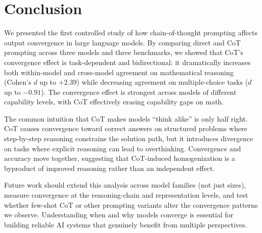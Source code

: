 \section{Conclusion}
\label{sec:conclusion}

We presented the first controlled study of how chain-of-thought prompting affects output convergence in large language models. By comparing direct and CoT prompting across three models and three benchmarks, we showed that CoT's convergence effect is task-dependent and bidirectional: it dramatically increases both within-model and cross-model agreement on mathematical reasoning (Cohen's $d$ up to $+2.39$) while decreasing agreement on multiple-choice tasks ($d$ up to $-0.91$). The convergence effect is strongest across models of different capability levels, with CoT effectively erasing capability gaps on math.

The common intuition that CoT makes models ``think alike'' is only half right. CoT causes convergence toward correct answers on structured problems where step-by-step reasoning constrains the solution path, but it introduces divergence on tasks where explicit reasoning can lead to overthinking. Convergence and accuracy move together, suggesting that CoT-induced homogenization is a byproduct of improved reasoning rather than an independent effect.

Future work should extend this analysis across model families (not just sizes), measure convergence at the reasoning-chain and representation levels, and test whether few-shot CoT or other prompting variants alter the convergence patterns we observe. Understanding when and why models converge is essential for building reliable AI systems that genuinely benefit from multiple perspectives.
